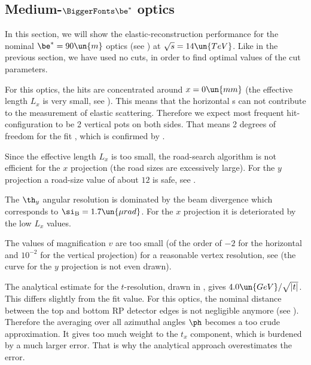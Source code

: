 

\def\OutlineLabel{Medium-beta* optics}
\def\TOCLabel{Medium-$\be^*$ optics}
\subsection[elr 90]{Medium-$\BiggerFonts\mathbf\be^*$ optics}

In this section, we will show the elastic-reconstruction performance for the nominal $\be^* = 90\un{m}$ optics (see ) at $\sqrt s = 14\un{TeV}$. Like in the previous section, we have used no cuts, in order to find optimal values of the cut parameters.

For this optics, the hits are concentrated around $x=0\un{mm}$ (the effective length $L_x$ is very small, see ). This means that the horizontal s can not contribute to the measurement of elastic scattering. Therefore we expect most frequent hit-configuration to be 2 vertical pots on both sides. That means 2 degrees of freedom for the fit , which is confirmed by .

Since the effective length $L_x$ is too small, the road-search algorithm is not efficient for the $x$ projection (the road sizes are excessively large). For the $y$ projection a road-size value of about $12$ is safe, see .

\bmfig
{}
\emfig

The $\th_y$ angular resolution is dominated by the beam divergence which corresponds to $\si_{\rm B} = 1.7\un{\mu rad}$. For the $x$ projection it is deteriorated by the low $L_x$ values.

The values of magnification $v$ are too small (of the order of $-2$ for the horizontal and $10^{-2}$ for the vertical projection) for a reasonable vertex resolution, see  (the curve for the $y$ projection is not even drawn).

\bmfig
{}
\emfig

The analytical estimate  for the $t$-resolution, drawn in , gives $4.0\un{GeV}/\sqrt{|t|}$. This differs slightly from the fit value. For this optics, the nominal distance between the top and bottom RP detector edges is not negligible anymore (see ). Therefore the averaging over all azimuthal angles $\ph$ becomes a too crude approximation. It gives too much weight to the $t_x$ component, which is burdened by a much larger error. That is why the analytical approach overestimates the error.

